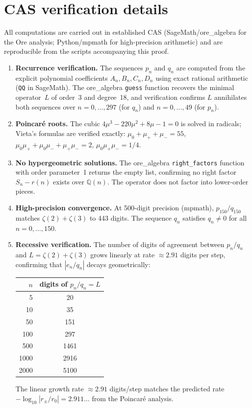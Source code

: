 \documentclass[11pt]{article}
\theoremstyle{remark}
\begin{document}
\section{CAS verification details}\label{sec:cas}

All computations are carried out in established CAS
(SageMath/ore\_algebra for the Ore analysis; Python/mpmath for
high-precision arithmetic) and are reproducible from the
scripts accompanying this proof.

\begin{enumerate}
\item \textbf{Recurrence verification.} The sequences $p_n$
and $q_n$ are computed from the explicit polynomial
coefficients $A_n, B_n, C_n, D_n$ using exact rational
arithmetic (\texttt{QQ} in SageMath). The ore\_algebra
\texttt{guess} function recovers the minimal operator~$L$
of order~3 and degree~18, and verification confirms $L$
annihilates both sequences over $n = 0, \ldots, 297$ (for
$q_n$) and $n = 0, \ldots, 49$ (for $p_n$).

\item \textbf{Poincar\'e roots.} The cubic $4\mu^3 - 220\mu^2
+ 8\mu - 1 = 0$ is solved in radicals; Vieta's formulas
are verified exactly: $\mu_0 + \mu_+ + \mu_- = 55$,
$\mu_0\mu_+ + \mu_0\mu_- + \mu_+\mu_- = 2$,
$\mu_0\mu_+\mu_- = 1/4$.

\item \textbf{No hypergeometric solutions.} The ore\_algebra
\texttt{right\_factors} function with order parameter~1
returns the empty list, confirming no right factor
$S_n - r(n)$ exists over $\mathbb{Q}(n)$. The operator
does not factor into lower-order pieces.

\item \textbf{High-precision convergence.}
At 500-digit precision (mpmath), $p_{150}/q_{150}$ matches
$\zeta(2) + \zeta(3)$ to 443 digits. The sequence $q_n$
satisfies $q_n \neq 0$ for all $n = 0, \ldots, 150$.

\item \textbf{Recessive verification.} The number of digits
of agreement between $p_n/q_n$ and $L = \zeta(2)+\zeta(3)$
grows linearly at rate $\approx 2.91$ digits per step,
confirming that $|e_n/q_n|$ decays geometrically:
\begin{center}
\begin{tabular}{rc}
$n$ & digits of $p_n/q_n = L$ \\
\hline
5 & 20 \\
10 & 35 \\
50 & 151 \\
100 & 297 \\
500 & 1461 \\
1000 & 2916 \\
2000 & 5100 \\
\end{tabular}
\end{center}
The linear growth rate $\approx 2.91$ digits/step matches
the predicted rate $-\log_{10}|r_\pm/r_0| = 2.911\ldots$
from the Poincar\'e analysis.
\end{enumerate}
\end{document}
